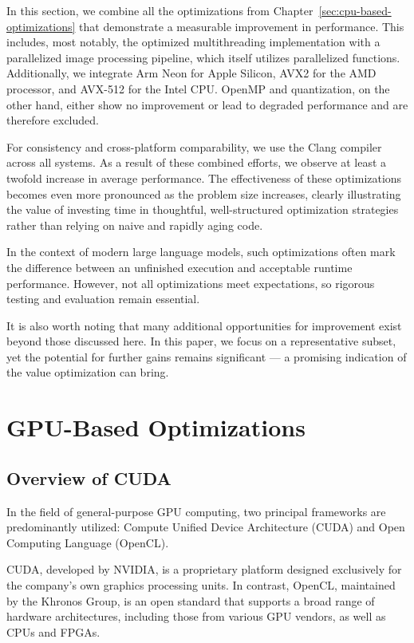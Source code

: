 \documentclass[modern,longauthor]{aastex7}
\begin{document}
In this section, we combine all the optimizations from Chapter~\ref{sec:cpu-based-optimizations} that demonstrate a measurable improvement in performance. This includes, most notably, the optimized multithreading implementation with a parallelized image processing pipeline, which itself utilizes parallelized functions. Additionally, we integrate Arm Neon for Apple Silicon, AVX2 for the AMD processor, and AVX-512 for the Intel CPU. OpenMP and quantization, on the other hand, either show no improvement or lead to degraded performance and are therefore excluded.

For consistency and cross-platform comparability, we use the Clang compiler across all systems. As a result of these combined efforts, we observe at least a twofold increase in average performance. The effectiveness of these optimizations becomes even more pronounced as the problem size increases, clearly illustrating the value of investing time in thoughtful, well-structured optimization strategies rather than relying on naive and rapidly aging code.

In the context of modern large language models, such optimizations often mark the difference between an unfinished execution and acceptable runtime performance. However, not all optimizations meet expectations, so rigorous testing and evaluation remain essential.

It is also worth noting that many additional opportunities for improvement exist beyond those discussed here. In this paper, we focus on a representative subset, yet the potential for further gains remains significant — a promising indication of the value optimization can bring.
\section{GPU-Based Optimizations}\label{sec:gpu-based-optimizations}
\subsection{Overview of CUDA}

In the field of general-purpose GPU computing, two principal frameworks are predominantly utilized: Compute Unified Device Architecture (CUDA) and Open Computing Language (OpenCL).

CUDA, developed by NVIDIA, is a proprietary platform designed exclusively for the company's own graphics processing units. In contrast, OpenCL, maintained by the Khronos Group, is an open standard that supports a broad range of hardware architectures, including those from various GPU vendors, as well as CPUs and FPGAs.
\end{document}
